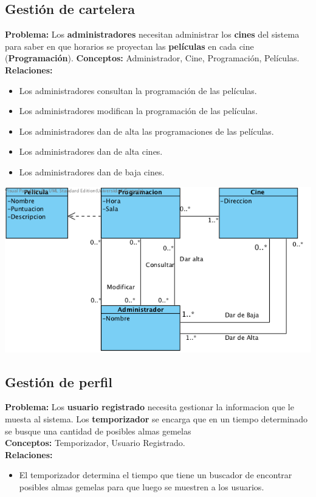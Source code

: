 \documentclass{article}
\begin{document}
	\subsection*{Gestión de cartelera}
	\textbf{Problema:} Los \textbf{administradores} necesitan administrar los \textbf{cines} del sistema para saber en que horarios se proyectan 
	las \textbf{películas} en cada cine (\textbf{Programación}).
	\textbf{Conceptos:} Administrador, Cine, Programación, Películas.\\
	\textbf{	Relaciones:}
		\begin{itemize}
			\item Los administradores consultan la programación de las películas.
			\item Los administradores modifican la programación de las películas.
			\item Los administradores dan de alta las programaciones de las películas.
			\item Los administradores dan de alta cines.
			\item Los administradores dan de baja cines.
		\end{itemize}
	\includegraphics[width=1\linewidth]{./C-Cartelera}
	
	
	\subsection*{Gestión de perfil}
	\textbf{Problema:} Los \textbf{usuario registrado} necesita gestionar la informacion que le muesta al sistema.
Los \textbf{temporizador} se encarga que en un tiempo determinado se busque una cantidad de posibles almas gemelas\\
\textbf{Conceptos:} Temporizador, Usuario Registrado.\\
\textbf{	Relaciones:}
	\begin{itemize}
    	\item El temporizador determina el tiempo que tiene un buscador de encontrar posibles almas gemelas para que luego se muestren a los usuarios.      	
    \end{itemize}
\end{document}
